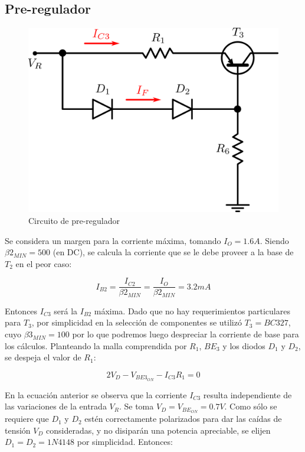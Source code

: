 \subsection{Pre-regulador}

\begin{figure}[!ht]
\begin{centering}
\includegraphics[scale=0.5]{Imagenes/PreRegulador.png}
\par\end{centering}
\caption{Circuito de pre-regulador}

\end{figure}

Se considera un margen para la corriente m\'axima, tomando $I_O = 1.6A$. Siendo $\beta2_{MIN} = 500$ (en DC), se calcula la corriente que se le debe proveer a la base de $T_2$ en el peor caso:

\[
I_{B2} = \frac{I_{C2}}{\beta2_{MIN}} = \frac{I_O}{\beta2_{MIN}}= 3.2mA
\]

Entonces $I_{C3}$ ser\'a la $I_{B2}$ m\'axima. Dado que no hay requerimientos particulares para $T_3$, por simplicidad en la selecci\'on de componentes se utiliz\'o  $T_3 = BC327$, cuyo $\beta3_{MIN} = 100$ por lo que podremos luego despreciar la corriente de base para los c\'alculos. Planteando la malla comprendida por $R_1$, $BE_3$ y los diodos $D_1$ y $D_2$, se despeja el valor de $R_1$:

\[
2V_D - V_{{BE3}_{ON}} - I_{C3}R_1 = 0
\]

\par
En la ecuaci\'on anterior se observa que la corriente $I_{C3}$ resulta independiente de las variaciones de la entrada $V_R$. Se toma $V_D = V_{{BE}_{ON}} = 0.7V$. Como s\'olo se requiere que $D_1$ y $D_2$ est\'en correctamente polarizados para dar las ca\'idas de tensi\'on $V_D$ consideradas, y no disipar\'an una potencia apreciable, se elijen $D_1 = D_2 = 1N4148$ por simplicidad. Entonces:

